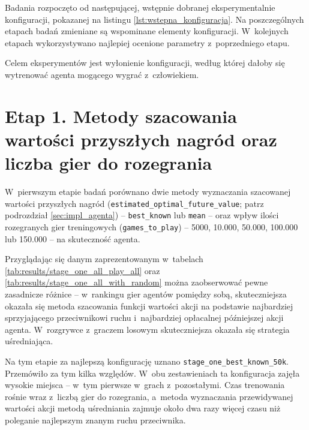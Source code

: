 \documentclass[a4paper, 12pt, oneside]{report}
\begin{document}
Badania rozpoczęto od następującej, wstępnie dobranej eksperymentalnie konfiguracji, pokazanej na listingu \ref{lst:wstepna_konfiguracja}. Na poszczególnych etapach badań zmieniane są wspominane elementy konfiguracji. W~kolejnych etapach wykorzystywano najlepiej ocenione parametry z~poprzedniego etapu.

Celem eksperymentów jest wyłonienie konfiguracji, według której dałoby się wytrenować agenta mogącego wygrać z~człowiekiem.

\needspace{5em}



\section{Etap 1. Metody szacowania wartości przyszłych nagród oraz liczba gier do rozegrania}

 W~pierwszym etapie badań porównano dwie metody wyznaczania szacowanej wartości przyszłych nagród (\texttt{estimated\_optimal\_future\_value}; patrz podrozdział \ref{sec:impl_agenta}) -- \texttt{best\_known} lub \texttt{mean} -- oraz wpływ ilości rozegranych gier treningowych (\texttt{games\_to\_play}) -- 5000, 10.000, 50.000, 100.000 lub 150.000 -- na skuteczność agenta.

\needspace{5em}



\needspace{5em}



Przyglądając się danym zaprezentowanym w~tabelach \ref{tab:results/stage_one_all_play_all} oraz \ref{tab:results/stage_one_all_with_random} można zaobserwować pewne zasadnicze różnice -- w~rankingu gier agentów pomiędzy sobą, skuteczniejsza okazała się metoda szacowania funkcji wartości akcji na podstawie najbardziej sprzyjającego przeciwnikowi ruchu i~najbardziej opłacalnej późniejszej akcji agenta. W~rozgrywce z~graczem losowym skuteczniejsza okazała się strategia uśredniająca.

Na tym etapie za najlepszą konfigurację uznano \texttt{stage\_one\_best\_known\_50k}. Przemówiło za tym kilka względów. W~obu zestawieniach ta konfiguracja zajęła wysokie miejsca -- w~tym pierwsze w~grach z~pozostałymi. Czas trenowania rośnie wraz z~liczbą gier do rozegrania, a~metoda wyznaczania przewidywanej wartości akcji metodą uśredniania zajmuje około dwa razy więcej czasu niż poleganie najlepszym znanym ruchu przeciwnika.
\end{document}
